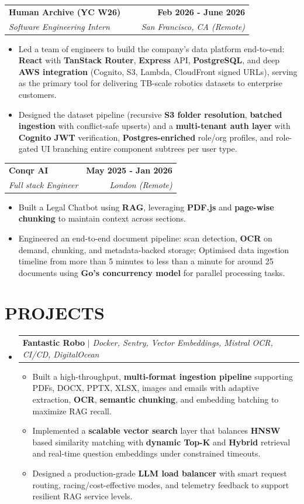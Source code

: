 \documentclass[letterpaper,11pt]{article}
\makeatletter
\newcommand{\yclogo}{%
  \raisebox{9.5pt}{%
    \scalebox{1}[-1]{%
      \resizebox{!}{12pt}{%
        \begin{tikzpicture}[y=1pt, x=1pt]
          \fill[ycorange] svg{M47.9985 47.9994H0V0H47.9985V47.9994Z};
          \fill[white] svg{M13.9012 11.7843H17.6595L22.4961 21.5325C23.203 22.9836 23.7984 24.3976 23.7984 24.3976C23.7984 24.3976 24.4313 23.021 25.175 21.5325L30.0868 11.7843H33.5843L25.2865 27.3746V37.309H22.1244V27.1884L13.9012 11.7843Z};
        \end{tikzpicture}%
      }%
    }%
  }%
}
\newcommand{\resumeItem}[1]{
  \item\small{
    {#1 \vspace{0pt}}
  }
}
\newcommand{\resumeSubheading}[4]{
  \vspace{-1pt}\item
    \begin{tabular*}{1.0\textwidth}[t]{l@{\extracolsep{\fill}}r}
      \textbf{\large#1} & \textbf{\small #2} \\
      \textit{\large#3} & \textit{\small #4} \\
      
    \end{tabular*}\vspace{-7pt}
}
\newcommand{\resumeSubHeadingListStart}{\begin{itemize}[leftmargin=0.0in, label={}]}
\newcommand{\resumeSubHeadingListEnd}{\end{itemize}}
\newcommand{\resumeItemListStart}{\begin{itemize}}
\newcommand{\resumeItemListEnd}{\end{itemize}\vspace{-5pt}}
\newcommand{\resumeProject}[2]{
    \item
    \begin{tabular*}{0.001\textwidth}{l@{\extracolsep{\fill}}r}
      \small#1 & \textbf{\small #2}\\
    \end{tabular*}\vspace{-6pt}
}
\makeatother
\begin{document}
\resumeSubheading
{Human Archive (YC W26) \yclogo\ \  }{Feb 2026 - June 2026}
{Software Engineering Intern}{San Francisco, CA (Remote)}
\resumeItemListStart
    \resumeItem{Led a team of engineers to build the company's data platform end-to-end: \textbf{React} with \textbf{TanStack Router}, \textbf{Express} API, \textbf{PostgreSQL}, and deep \textbf{AWS integration} (Cognito, S3, Lambda, CloudFront signed URLs), serving as the primary tool for delivering TB-scale robotics datasets to enterprise customers.}
    \resumeItem{Designed the dataset pipeline (recursive \textbf{S3 folder resolution}, \textbf{batched ingestion} with conflict-safe upserts) and a \textbf{multi-tenant auth layer} with \textbf{Cognito JWT} verification, \textbf{Postgres-enriched} role/org profiles, and role-gated UI branching entire component subtrees per user type.}
\resumeItemListEnd

\resumeSubheading
{Conqr AI}{May 2025 - Jan 2026}
{Full stack Engineer}{London (Remote)}
\resumeItemListStart
    \resumeItem{Built a Legal Chatbot using \textbf{RAG}, leveraging \textbf{PDF.js} and \textbf{page-wise chunking} to maintain context across sections.}
    \resumeItem{Engineered an end-to-end document pipeline: scan detection, \textbf{OCR} on demand, chunking, and metadata-backed storage; Optimised data ingestion timeline from more than 5 minutes to less than a minute for around 25 documents using \textbf{Go's concurrency model} for parallel processing tasks.}
\resumeItemListEnd

\section{PROJECTS}
\resumeSubHeadingListStart
\resumeProject
{
	\textbf{Fantastic Robo}
	\href{https://github.com/HackRx-6/Squirtle-Squad}{\faGithub} $|$ \small{\textit{Docker, Sentry, Vector Embeddings, Mistral OCR, CI/CD, DigitalOcean} }
}{}
    \resumeItemListStart
        \resumeItem {Built a high-throughput, \textbf{multi-format ingestion pipeline} supporting PDFs, DOCX, PPTX, XLSX, images and emails with adaptive extraction, \textbf{OCR}, \textbf{semantic chunking}, and embedding batching to maximize RAG recall. }
        \resumeItem {Implemented a \textbf{scalable vector search} layer that balances \textbf{HNSW} based similarity matching with \textbf{dynamic Top-K} and \textbf{Hybrid} retrieval and real-time question embeddings under constrained timeouts.}
        \resumeItem{Designed a production-grade \textbf{LLM load balancer} with smart request routing, racing/cost-effective modes, and telemetry feedback to support resilient RAG service levels.}
    \resumeItemListEnd
\resumeSubHeadingListEnd
\end{document}
